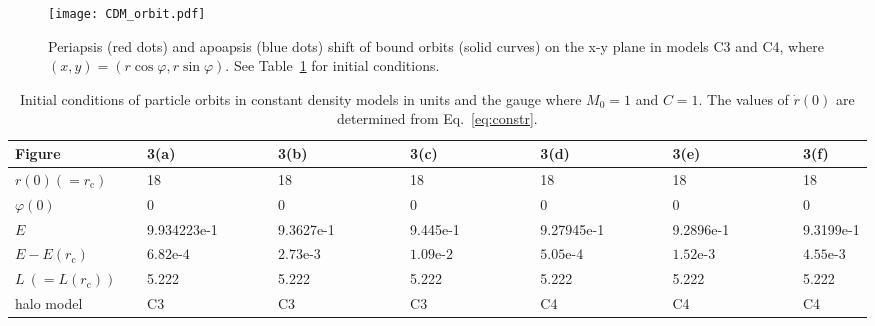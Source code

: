\documentclass[aps,11pt,nofootinbib,preprintnumbers,groupedaddress,superscriptaddress]{revtex4-2}
\begin{document}
\begin{figure}[t]
\centering
\texttt{[image: CDM\_orbit.pdf]}
\caption{Periapsis (red dots) and apoapsis (blue dots) shift of bound orbits (solid curves) on the x-y plane in models C3 and C4, where $(x, y)=(r \cos \varphi, r\sin \varphi)$.
See Table~\ref{table:CDMini} for initial conditions. 
}
\label{fig:cdns}
\end{figure}
%
\begin{table}
\begin{tabular}{lllllll}
\hline
\hline
Figure~~~~~~~~~
&3(a)~~~~~~~~~~~
&3(b)~~~~~~~~~~~
&3(c)~~~~~~~~~~~
&3(d)~~~~~~~~~~~
&3(e)~~~~~~~~~~~
&3(f)
\\
\hline
$r(0) (=r_{\mathrm{c}})$
&18&18&18&18&18&18
\\
$\varphi(0)$
&$0$
&$0$
&$0$
&$0$
&$0$
&$0$
\\
$E$
&9.934223e-1
&9.3627e-1
&9.445e-1
&9.27945e-1
&9.2896e-1
&9.3199e-1
\\
$E-E(r_{\mathrm{c}})$
&$6.82\textrm{e-}4$
&$2.73\textrm{e-}3$
&$1.09\textrm{e-}2$
&$5.05\textrm{e-}4$
&$1.52\textrm{e-}3$
&$4.55\textrm{e-}3$
\\
$L\:\! (=L(r_{\mathrm{c}}))$
&5.222
&5.222
&5.222
&5.222
&5.222
&5.222
\\
halo model &C3&C3&C3&C4&C4&C4
\\
\hline
\hline
\end{tabular}
\caption{Initial conditions of particle orbits in constant density models in units and the gauge where $M_0=1$ and $C=1$. The values of $\dot{r}(0)$ are determined from Eq.~\eqref{eq:constr}.}
\label{table:CDMini}
\end{table}


\end{document}
